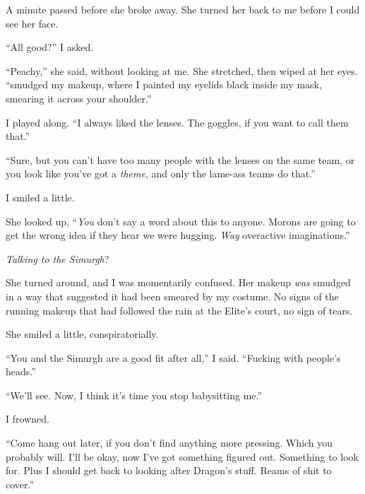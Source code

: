 A minute passed before she broke away.  She turned her back to me before I could see her face.



``All good?'' I asked.



``Peachy,'' she said, without looking at me.  She stretched, then wiped at her eyes.  ``smudged my makeup, where I painted my eyelids black inside my mask, smearing it across your shoulder.''



I played along.  ``I always liked the lenses.  The goggles, if you want to call them that.''



``Sure, but you can't have too many people with the lenses on the same team, or you look like you've got a \emph{theme}, and only the lame-ass teams do that.''



I smiled a little.



She looked up, ``\emph{You }don't say a word about this to anyone.  Morons are going to get the wrong idea if they hear we were hugging.  \emph{Way} overactive imaginations.''



\emph{Talking to the Simurgh}?



She turned around, and I was momentarily confused.  Her makeup \emph{was} smudged in a way that suggested it had been smeared by my costume.  No signs of the running makeup that had followed the rain at the Elite's court, no sign of tears.



She smiled a little, conspiratorially.



``You and the Simurgh are a good fit after all,'' I said.  ``Fucking with people's heads.''



``We'll see.  Now, I think it's time you stop babysitting me.''



I frowned.



``Come hang out later, if you don't find anything more pressing.  Which you probably will.  I'll be okay, now I've got something figured out.  Something to look for.  Plus I should get back to looking after Dragon's stuff.  Reams of shit to cover.''



